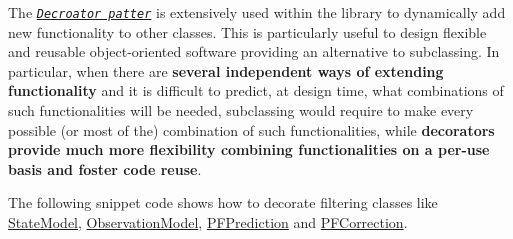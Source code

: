 The \href{https://en.wikipedia.org/wiki/Decorator_pattern}{\tt {\itshape Decroator patter}} is extensively used within the library to dynamically add new functionality to other classes. This is particularly useful to design flexible and reusable object-\/oriented software providing an alternative to subclassing. In particular, when there are {\bfseries several independent ways of extending functionality} and it is difficult to predict, at design time, what combinations of such functionalities will be needed, subclassing would require to make every possible (or most of the) combination of such functionalities, while {\bfseries decorators provide much more flexibility combining functionalities on a per-\/use basis and foster code reuse}.~\newline


The following snippet code shows how to decorate filtering classes like \mbox{\hyperlink{classbfl_1_1StateModel}{State\+Model}}, \mbox{\hyperlink{classbfl_1_1ObservationModel}{Observation\+Model}}, \mbox{\hyperlink{classbfl_1_1PFPrediction}{P\+F\+Prediction}} and \mbox{\hyperlink{classbfl_1_1PFCorrection}{P\+F\+Correction}}.


